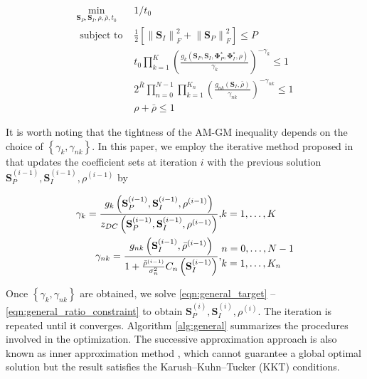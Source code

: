 \begin{eqnarray}
  {\mathop {\min }\limits_{{{\mathbf{S}}_P},{{\mathbf{S}}_I},\rho ,\bar \rho ,{t_0}} }&{1/{t_0}} \label{eqn:general_target} \\
  {{\text{ subject to }}}&{\frac{1}{2}\left[ {\left\| {{{\mathbf{S}}_I}} \right\|_F^2 + \left\| {{{\mathbf{S}}_P}} \right\|_F^2} \right] \leqslant P} \label{eqn:general_power_constraint} \\
  {}&{{t_0}\prod\limits_{k = 1}^K {{{\left( {\frac{{{g_k}\left( {{{\mathbf{S}}_P},{{\mathbf{S}}_I},{\mathbf{\Phi }}_P^ \star ,{\mathbf{\Phi }}_I^ \star ,\rho } \right)}}{{{\gamma _k}}}} \right)}^{ - {\gamma _k}}}}  \leqslant 1} \label{eqn:general_current_constraint} \\
  {}&{2^{\bar R}}\prod\limits_{n = 0}^{N - 1} {\prod\limits_{k = 1}^{{K_n}} {{{\left( {\frac{{{g_{nk}}\left( {{{\mathbf{S}}_I},\bar \rho } \right)}}{{{\gamma _{nk}}}}} \right)}^{ - {\gamma _{nk}}}}} }  \leqslant 1 \label{eqn:general_rate_constraint} \\
  {}&{\rho  + \bar \rho  \leqslant 1} \label{eqn:general_ratio_constraint}
\end{eqnarray}

It is worth noting that the tightness of the AM-GM inequality depends on the choice of $\left\{ {{\gamma _k},{\gamma _{nk}}} \right\}$. In this paper, we employ the iterative method proposed in \cite{Clerckx2018} that updates the coefficient sets at iteration $i$ with the previous solution ${{\mathbf{S}}_P^{(i - 1)},{\mathbf{S}}_I^{(i - 1)},{\rho ^{(i - 1)}}}$ by

\begin{eqnarray}
  {{\gamma _k} = \frac{{{g_k}\left( {{\mathbf{S}}_P^{(i - 1)},{\mathbf{S}}_I^{(i - 1)},{\rho ^{(i - 1)}}} \right)}}{{{z_{DC}}\left( {{\mathbf{S}}_P^{(i - 1)},{\mathbf{S}}_I^{(i - 1)},{\rho ^{(i - 1)}}} \right)}},}&{k = 1, \ldots ,K} \\
  {{\gamma _{nk}} = \frac{{{g_{nk}}\left( {{\mathbf{S}}_I^{(i - 1)},{{\bar \rho }^{(i - 1)}}} \right)}}{{1 + \frac{{{{\bar \rho }^{(i - 1)}}}}{{\sigma _n^2}}{C_n}\left( {{\mathbf{S}}_I^{(i - 1)}} \right)}},}&\begin{gathered}
  n = 0, \ldots ,N - 1 \hfill \\
  k = 1, \ldots ,{K_n} \hfill \\
\end{gathered}
\end{eqnarray}

Once $\left\{ {{\gamma _k},{\gamma _{nk}}} \right\}$ are obtained, we solve \eqref{eqn:general_target} -- \eqref{eqn:general_ratio_constraint} to obtain ${\mathbf{S}}_P^{(i)},{\mathbf{S}}_I^{(i)},{\rho ^{(i)}}$. The iteration is repeated until it converges. Algorithm \ref{alg:general} summarizes the procedures involved in the optimization. The successive approximation approach is also known as inner approximation method \cite{Marks1978}, which cannot guarantee a global optimal solution but the result satisfies the Karush–Kuhn–Tucker (KKT) conditions.

